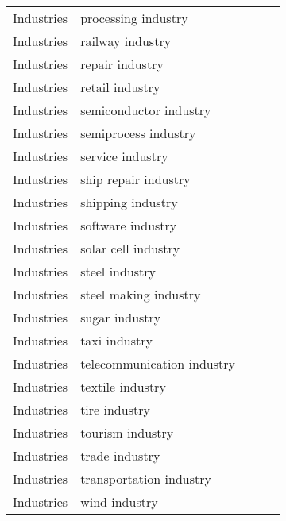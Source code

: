 {\begin{longtable}{lp{3cm}>{\raggedright\arraybackslash}p{6cm}>{\raggedright\arraybackslash}p{6cm}>{\raggedright\arraybackslash}p{8cm}}
Industries & processing industry &  &  & \\
Industries & railway industry &  &  & \\
Industries & repair industry &  &  & \\
Industries & retail industry &  &  & \\
Industries & semiconductor industry &  &  & \\
Industries & semiprocess industry &  &  & \\
Industries & service industry &  &  & \\
Industries & ship repair industry &  &  & \\
Industries & shipping industry &  &  & \\
Industries & software industry &  &  & \\
Industries & solar cell industry &  &  & \\
Industries & steel industry &  &  & \\
Industries & steel making industry &  &  & \\
Industries & sugar industry &  &  & \\
Industries & taxi industry &  &  & \\
Industries & telecommunication industry &  &  & \\
Industries & textile industry &  &  & \\
Industries & tire industry &  &  & \\
Industries & tourism industry &  &  & \\
Industries & trade industry &  &  & \\
Industries & transportation industry &  &  & \\
Industries & wind industry &  &  & \\
\end{longtable}
}

